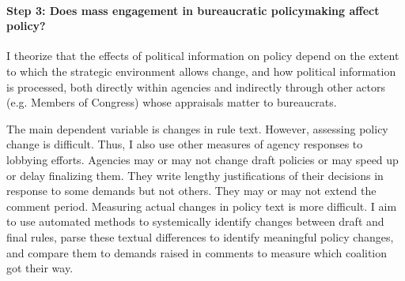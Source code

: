 





\paragraph{Step 3: Does mass engagement in bureaucratic policymaking affect policy?} 

I theorize that the effects of political information on policy depend on the extent to which the strategic environment allows change, and how political information is processed, both directly within agencies and indirectly through other actors (e.g. Members of Congress) whose appraisals matter to bureaucrats.

The main dependent variable is changes in rule text. However, assessing policy change is difficult. Thus, I also use other measures of agency responses to lobbying efforts. 
Agencies may or may not change draft policies or may speed up or delay finalizing them. They write lengthy justifications of their decisions in response to some demands but not others. They may or may not extend the comment period. Measuring actual changes in policy text is more difficult. I aim to use automated methods to systemically identify changes between draft and final rules, parse these textual differences to identify meaningful policy changes, and compare them to demands raised in comments to measure which coalition got their way.


